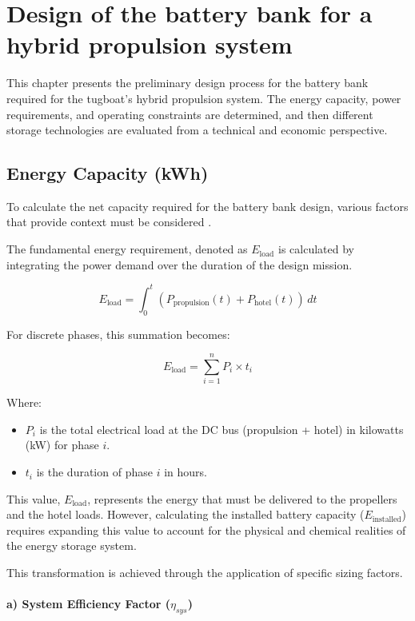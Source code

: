 \chapter{Design of the battery bank for a hybrid propulsion system}

This chapter presents the preliminary design process for the battery bank required for the tugboat's hybrid propulsion system. The energy capacity, power requirements, and operating constraints are determined, and then different storage technologies are evaluated from a technical and economic perspective.


\section{Energy Capacity (kWh)}
To calculate the net capacity required for the battery bank design, various factors that provide context must be considered \cite{IEEE1184} \cite{ieng}. 

The fundamental energy requirement, denoted as $E_{\text{load}}$ is calculated by integrating the power demand over the duration of the design mission.

$$E_{\text{load}} = \int_{0}^{t} (P_{\text{propulsion}}(t) + P_{\text{hotel}}(t)) \,dt$$

For discrete phases, this summation becomes:

$$E_{\text{load}} = \sum_{i=1}^{n} P_i \times t_i$$

Where:

\begin{itemize}
	\item $P_i$ is the total electrical load at the DC bus (propulsion + hotel) in kilowatts (kW) for phase $i$.
	\item $t_i$ is the duration of phase $i$ in hours.
\end{itemize}

This value, $E_{\text{load}}$, represents the energy that must be delivered to the propellers and the hotel loads. However, calculating the installed battery capacity ($E_{\text{installed}}$) requires expanding this value to account for the physical and chemical realities of the energy storage system.

This transformation is achieved through the application of specific sizing factors.

\subsubsection{a) System Efficiency Factor ($\eta_{sys}$)}

